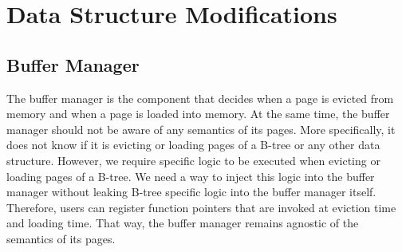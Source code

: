 
\section{Data Structure Modifications}
\subsection*{Buffer Manager}
The buffer manager is the component that decides when a page is evicted from memory and when a page is loaded into memory.
At the same time, the buffer manager should not be aware of any semantics of its pages.
More specifically, it does not know if it is evicting or loading pages of a B-tree or any other data structure.
However, we require specific logic to be executed when evicting or loading pages of a B-tree.
We need a way to inject this logic into the buffer manager without leaking B-tree specific logic into the buffer manager itself.
Therefore, users can register function pointers that are invoked at eviction time and loading time.
That way, the buffer manager remains agnostic of the semantics of its pages.

